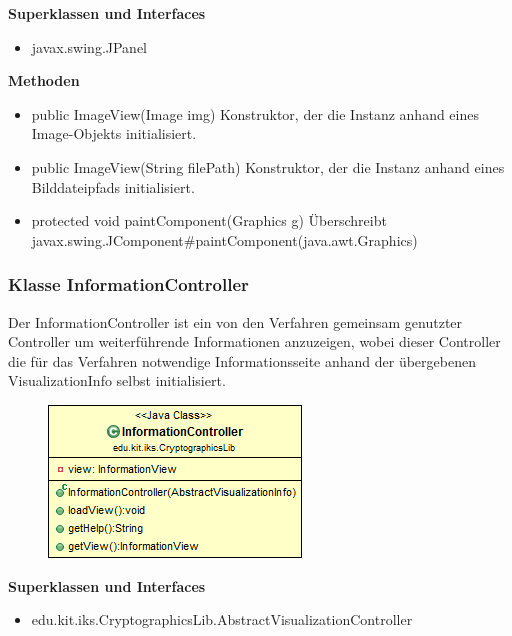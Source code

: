 \documentclass{article}
\begin{document}
      \textbf{Superklassen und Interfaces}
      \begin{itemize}
        \item javax.swing.JPanel
      \end{itemize}
	
      \textbf{Methoden}
      \begin{itemize}
        \item public ImageView(Image img) \newline
          Konstruktor, der die Instanz anhand eines Image-Objekts initialisiert.
        \item public ImageView(String filePath) \newline
          Konstruktor, der die Instanz anhand eines Bilddateipfads initialisiert.
        \item protected void paintComponent(Graphics g) \newline
          Überschreibt javax.swing.JComponent\#paintComponent(java.awt.Graphics)
      \end{itemize}
	
	\subsubsection{Klasse InformationController}
	  Der InformationController ist ein von den Verfahren gemeinsam genutzter
	  Controller um weiterführende Informationen anzuzeigen, wobei dieser Controller
	  die für das Verfahren notwendige Informationsseite anhand der übergebenen VisualizationInfo
	  selbst initialisiert.
	
      \begin{figure}[H]
        \centering
        \includegraphics{resources/edu-kit-iks-CryptographicsLib-InformationController}
      \end{figure}
	
      \textbf{Superklassen und Interfaces}
      \begin{itemize}
        \item edu.kit.iks.CryptographicsLib.AbstractVisualizationController
      \end{itemize}
	
\end{document}
